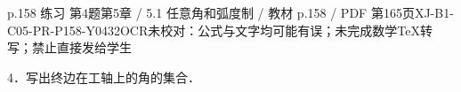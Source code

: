 \begin{bankitem}{p.158 练习 第4题}{第5章 / 5.1 任意角和弧度制 / 教材 p.158 / PDF 第165页}{XJ-B1-C05-PR-P158-Y0432}{OCR未校对：公式与文字均可能有误；未完成数学TeX转写；禁止直接发给学生}
\begin{ocrdraft}
\par
4．写出终边在工轴上的角的集合．
\end{ocrdraft}
\end{bankitem}
